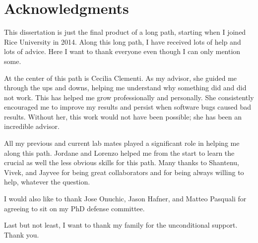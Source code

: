 \chapter*{Acknowledgments}


This dissertation is just the final product of a long path, starting when I joined Rice University in 2014.
Along this long path, I have received lots of help and lots of advice. Here I want to thank everyone even though 
I can only mention some.

At the center of this path is Cecilia Clementi. As my advisor, she guided me through the ups and downs, helping me understand why something did and did not work. This has helped me grow professionally
and personally.
She consistently encouraged me to improve my results and persist when software bugs caused bad results. Without her, this work would not have been possible; she has been an incredible advisor. 

All my previous and current lab mates played a significant role in helping me along this path. Jordane and Lorenzo helped me from the start to learn the crucial as well the less obvious skills for this path. Many thanks to Shantenu, Vivek, and Jayvee for being great collaborators and for being always willing to help, whatever the question.

I would also like to thank Jose Onuchic, Jason Hafner, and Matteo Pasquali for agreeing to sit on my PhD defense committee.

Last but not least, I want to thank my family for the unconditional support. Thank you.

